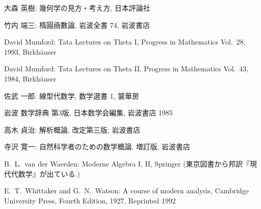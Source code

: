 \documentclass[12pt,twoside]{jarticle}
\begin{document}
\begin{thebibliography}{ABC}
大森 英樹: 幾何学の見方・考え方, 日本評論社

竹内 端三: 楕圓凾數論, 岩波全書 74, 岩波書店

David Mumford: Tata Lectures on Theta I,
Progress in Mathematics Vol.~28, 1993, Birkh\"auser

David Mumford: Tata Lectures on Theta II, 
Progress in Mathematics Vol.~43, 1984, Birkh\"auser

佐武 一郎: 線型代数学, 数学選書 1, 裳華房

岩波 数学辞典 第3版, 日本数学会編集, 岩波書店 1985

高木 貞治: 解析概論, 改定第三版, 岩波書店

寺沢 寛一: 自然科学者のための数学概論, 増訂版, 岩波書店

B.~L.~van der Waerden: Moderne Algebra I, II, Springer
(東京図書から邦訳『現代代数学』が出ている.)

E.~T.~Whittaker and G.~N.~Watson: A course of modern analysis,
Cambridge University Press, Fourth Edition, 1927, Reprinted 1992

\end{thebibliography}

\end{document}
